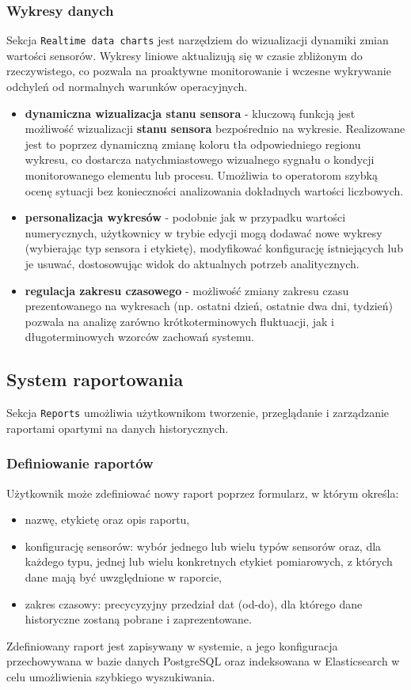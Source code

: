 \subsubsection{Wykresy danych}
Sekcja \texttt{Realtime data charts} jest narzędziem do wizualizacji dynamiki zmian wartości sensorów. Wykresy liniowe aktualizują się w czasie zbliżonym do rzeczywistego, co pozwala na proaktywne monitorowanie i wczesne wykrywanie odchyleń od normalnych warunków operacyjnych.
\begin{itemize}
    \item \textbf{dynamiczna wizualizacja stanu sensora} - kluczową funkcją jest możliwość wizualizacji \textbf{stanu sensora} bezpośrednio na wykresie. Realizowane jest to poprzez dynamiczną zmianę koloru tła odpowiedniego regionu wykresu, co dostarcza natychmiastowego wizualnego sygnału o kondycji monitorowanego elementu lub procesu. Umożliwia to operatorom szybką ocenę sytuacji bez konieczności analizowania dokładnych wartości liczbowych.
    \item \textbf{personalizacja wykresów} - podobnie jak w przypadku wartości numerycznych, użytkownicy w trybie edycji mogą dodawać nowe wykresy (wybierając typ sensora i etykietę), modyfikować konfigurację istniejących lub je usuwać, dostosowując widok do aktualnych potrzeb analitycznych.
    \item \textbf{regulacja zakresu czasowego} - możliwość zmiany zakresu czasu prezentowanego na wykresach (np. ostatni dzień, ostatnie dwa dni, tydzień) pozwala na analizę zarówno krótkoterminowych fluktuacji, jak i długoterminowych wzorców zachowań systemu.
\end{itemize}


\newpage

\subsection{System raportowania}
Sekcja \texttt{Reports} umożliwia użytkownikom tworzenie, przeglądanie i zarządzanie raportami opartymi na danych historycznych.

\subsubsection{Definiowanie raportów}
Użytkownik może zdefiniować nowy raport poprzez formularz, w którym określa:
\begin{itemize}
    \item nazwę, etykietę oraz opis raportu,
    \item konfigurację sensorów: wybór jednego lub wielu typów sensorów oraz, dla każdego typu, jednej lub wielu konkretnych etykiet pomiarowych, z których dane mają być uwzględnione w raporcie,
    \item zakres czasowy: precycyzyjny przedział dat (od-do), dla którego dane historyczne zostaną pobrane i zaprezentowane.
\end{itemize}
Zdefiniowany raport jest zapisywany w systemie, a jego konfiguracja przechowywana w bazie danych PostgreSQL oraz indeksowana w Elasticsearch w celu umożliwienia szybkiego wyszukiwania.

